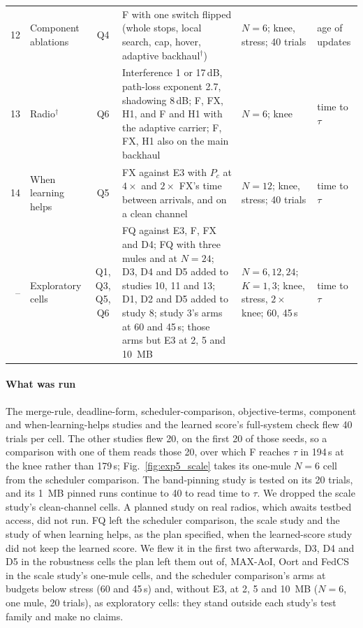 \documentclass[conference]{IEEEtran}
\begin{document}
\begin{table}[tp]
\begin{tabularx}{\textwidth}{@{}r l c L l l@{}}
12 & Component ablations & Q4 & F with one switch flipped (whole stops, local search, cap, hover, adaptive backhaul$^{\dagger}$) & $N{=}6$; knee, stress; 40 trials & age of updates \\
13 & Radio$^{\dagger}$ & Q6 & Interference 1 or 17\,dB, path-loss exponent 2.7, shadowing 8\,dB; F, FX, H1, and F and H1 with the adaptive carrier; F, FX, H1 also on the main backhaul & $N{=}6$; knee & time to $\tau$ \\
14 & When learning helps & Q5 & FX against E3 with $P_c$ at $4\times$ and $2\times$ FX's time between arrivals, and on a clean channel & $N{=}12$; knee, stress; 40 trials & time to $\tau$ \\
\midrule
-- & Exploratory cells & Q1, Q3, Q5, Q6 & FQ against E3, F, FX and D4; FQ with three mules and at $N{=}24$; D3, D4 and D5 added to studies 10, 11 and 13; D1, D2 and D5 added to study 8; study 3's arms at 60 and 45\,s; those arms but E3 at 2, 5 and 10~MB & $N{=}6,12,24$; $K{=}1,3$; knee, stress, $2\times$ knee; 60, 45\,s & time to $\tau$ \\
\bottomrule
\end{tabularx}
\end{table}

\paragraph{What was run}
The merge-rule, deadline-form, scheduler-comparison, objective-terms, component
and when-learning-helps studies and the learned score's full-system check flew
40 trials per cell. The other studies flew 20, on the first 20 of those seeds, so a comparison
with one of them reads those 20, over which F reaches $\tau$ in 194\,s at the
knee rather than 179\,s; Fig.~\ref{fig:exp5_scale} takes its one-mule $N=6$
cell from the scheduler comparison. The band-pinning study is
tested on its 20 trials, and its 1~MB pinned runs continue to 40 to read time to
$\tau$. We dropped the scale study's clean-channel cells. A planned study on real radios, which
awaits testbed access, did not run. FQ left the scheduler comparison, the scale
study and the study of when learning helps, as the plan specified, when the
learned-score study did not keep the learned score. We flew it in the first two
afterwards, D3, D4 and D5 in the robustness cells the plan left them out of, MAX-AoI,
Oort and FedCS in the scale study's one-mule cells, and the
scheduler comparison's arms at budgets below stress
(60 and 45\,s) and, without E3, at 2, 5 and 10~MB ($N=6$, one mule, 20 trials), as exploratory cells: they stand
outside each study's test family and make no claims.
\end{document}
